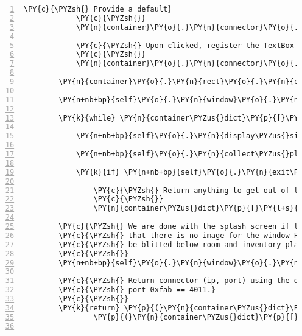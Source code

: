 \begin{Verbatim}[commandchars=\\\{\},numbers=left,firstnumber=1,stepnumber=1]
            \PY{c}{\PYZsh{} Provide a default}
            \PY{c}{\PYZsh{}}
            \PY{n}{container}\PY{o}{.}\PY{n}{connector}\PY{o}{.}\PY{n}{text} \PY{o}{=} \PY{l+s}{\PYZdq{}}\PY{l+s}{127.0.0.1}\PY{l+s}{\PYZdq{}}

            \PY{c}{\PYZsh{} Upon clicked, register the TextBox for keyboard input}
            \PY{c}{\PYZsh{}}
            \PY{n}{container}\PY{o}{.}\PY{n}{connector}\PY{o}{.}\PY{n}{left\PYZus{}click\PYZus{}callback} \PY{o}{=} \PY{k}{lambda} \PY{n}{plane} \PY{p}{:} \PY{n+nb+bp}{self}\PY{o}{.}\PY{n}{window}\PY{o}{.}\PY{n}{key\PYZus{}sensitive}\PY{p}{(}\PY{n}{plane}\PY{p}{)}

        \PY{n}{container}\PY{o}{.}\PY{n}{rect}\PY{o}{.}\PY{n}{center} \PY{o}{=} \PY{n+nb+bp}{self}\PY{o}{.}\PY{n}{window}\PY{o}{.}\PY{n}{rect}\PY{o}{.}\PY{n}{center}

        \PY{n+nb+bp}{self}\PY{o}{.}\PY{n}{window}\PY{o}{.}\PY{n}{sub}\PY{p}{(}\PY{n}{container}\PY{p}{)}

        \PY{k}{while} \PY{n}{container\PYZus{}dict}\PY{p}{[}\PY{l+s}{\PYZdq{}}\PY{l+s}{login\PYZus{}name}\PY{l+s}{\PYZdq{}}\PY{p}{]} \PY{o+ow}{is} \PY{n+nb+bp}{None}\PY{p}{:}

            \PY{n+nb+bp}{self}\PY{o}{.}\PY{n}{display\PYZus{}single\PYZus{}frame}\PY{p}{(}\PY{p}{)}

            \PY{n+nb+bp}{self}\PY{o}{.}\PY{n}{collect\PYZus{}player\PYZus{}input}\PY{p}{(}\PY{p}{)}

            \PY{k}{if} \PY{n+nb+bp}{self}\PY{o}{.}\PY{n}{exit\PYZus{}requested}\PY{p}{:}

                \PY{c}{\PYZsh{} Return anything to get out of the loop}
                \PY{c}{\PYZsh{}}
                \PY{n}{container\PYZus{}dict}\PY{p}{[}\PY{l+s}{\PYZdq{}}\PY{l+s}{login\PYZus{}name}\PY{l+s}{\PYZdq{}}\PY{p}{]} \PY{o}{=} \PY{l+s}{\PYZdq{}}\PY{l+s}{exit requested}\PY{l+s}{\PYZdq{}}

        \PY{c}{\PYZsh{} We are done with the splash screen if there was one. Now make sure}
        \PY{c}{\PYZsh{} that there is no image for the window Plane left that would invisibly}
        \PY{c}{\PYZsh{} be blitted below room and inventory planes.}
        \PY{c}{\PYZsh{}}
        \PY{n+nb+bp}{self}\PY{o}{.}\PY{n}{window}\PY{o}{.}\PY{n}{image} \PY{o}{=} \PY{n+nb+bp}{self}\PY{o}{.}\PY{n}{window}\PY{o}{.}\PY{n}{display}

        \PY{c}{\PYZsh{} Return connector (ip, port) using the default Fabula}
        \PY{c}{\PYZsh{} port 0xfab == 4011.}
        \PY{c}{\PYZsh{}}
        \PY{k}{return} \PY{p}{(}\PY{n}{container\PYZus{}dict}\PY{p}{[}\PY{l+s}{\PYZdq{}}\PY{l+s}{login\PYZus{}name}\PY{l+s}{\PYZdq{}}\PY{p}{]}\PY{p}{,}
                \PY{p}{(}\PY{n}{container\PYZus{}dict}\PY{p}{[}\PY{l+s}{\PYZdq{}}\PY{l+s}{connector}\PY{l+s}{\PYZdq{}}\PY{p}{]}\PY{p}{,} \PY{l+m+mi}{4011}\PY{p}{)}\PY{p}{)}


\end{Verbatim}
